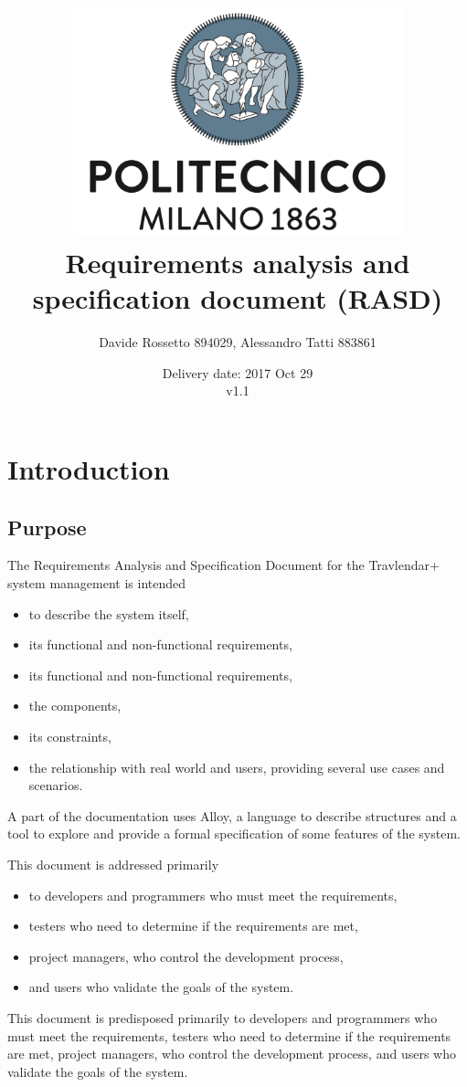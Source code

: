 \documentclass{article}
\title{ 
	\includegraphics[width=95mm]{img/PolimiLogo.png} \\
	\bigskip
	Requirements analysis and specification document (RASD)
}
\author{
	Davide Rossetto 894029, Alessandro Tatti 883861
}
\date{
	Delivery date: 2017 Oct 29\\
	\bigskip v1.1
}
\begin{document}
	
\maketitle
\newpage
\tableofcontents
\newpage
	
	
	\section{Introduction}
	
	
	\subsection{Purpose}
	The Requirements Analysis and Specification Document for the Travlendar+ system management is intended
	\begin{itemize}
		\item to describe the system itself, 
		\item its functional and non-functional requirements, 
		\item its functional and non-functional requirements, 
		\item the components, 
		\item its constraints,
		\item the relationship with real world and users,  providing several use cases and scenarios.
	\end{itemize}

	\bigskip
	A part of the documentation uses Alloy, a language to describe structures and a tool to explore and provide a formal specification of some features of the system.

	\bigskip
	This document is addressed primarily 
	\begin{itemize}
		\item to developers and programmers who must meet the requirements,
		\item testers who need to determine if the requirements are met,
		\item project managers, who control the development process,
		\item and users who validate the goals of the system.
	\end{itemize}
	
	\bigskip
	This document is predisposed primarily to developers and programmers who must meet the requirements, testers who need to determine if the requirements are met, project managers, who control the development process, and users who validate the goals of the system.
	
\end{document}
